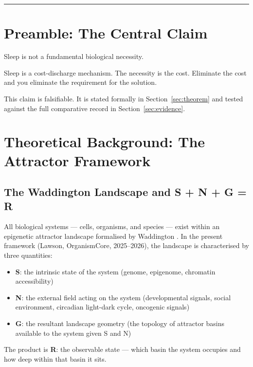\documentclass[12pt, a4paper]{article}
\begin{document}
\hrule

\section*{Preamble: The Central Claim}

Sleep is not a fundamental biological necessity.

Sleep is a cost-discharge mechanism. The necessity is
the cost. Eliminate the cost and you eliminate the
requirement for the solution.

This claim is falsifiable. It is stated formally in
Section~\ref{sec:theorem} and tested against the full
comparative record in Section~\ref{sec:evidence}.

\section{Theoretical Background: The Attractor Framework}
\label{sec:background}

\subsection{The Waddington Landscape and S + N + G = R}

All biological systems --- cells, organisms, and species ---
exist within an epigenetic attractor landscape formalised by
Waddington \cite{waddington1957}. In the present framework
(Lawson, OrganismCore, 2025--2026), the landscape is
characterised by three quantities:

\begin{itemize}
    \item \textbf{S}: the intrinsic state of the system
          (genome, epigenome, chromatin accessibility)
    \item \textbf{N}: the external field acting on the system
          (developmental signals, social environment,
          circadian light-dark cycle, oncogenic signals)
    \item \textbf{G}: the resultant landscape geometry
          (the topology of attractor basins available to the
          system given S and N)
\end{itemize}

The product is \textbf{R}: the observable state --- which basin
the system occupies and how deep within that basin it sits.
\end{document}
